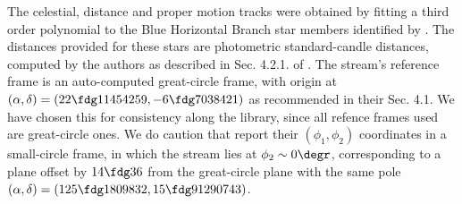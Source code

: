The celestial, distance and proper motion tracks were obtained by fitting a third order polynomial to the Blue Horizontal Branch star members identified by \citet[][data provided by G. Thomas  priv. comm.]{Thomas2021}. The distances provided for these stars are photometric standard-candle distances, computed by the authors as described in Sec. 4.2.1. of \citet{Thomas2021}. 
The stream's reference frame is an auto-computed great-circle frame, with origin at $(\alpha,\delta)=(22\fdg 11454259,-6\fdg 7038421)$ as recommended in their Sec. 4.1. We have chosen this for consistency along the library, since all refence frames used are great-circle ones. We do caution that \citet{Thomas2021} report their $(\phi_1,\phi_2)$ coordinates in a small-circle frame, in which the stream lies at $\phi_2\sim 0\degr$, corresponding to a plane offset by $14\fdg 36$ from the great-circle plane with the same pole $(\alpha,\delta)=(125\fdg 1809832,15\fdg 91290743)$.
